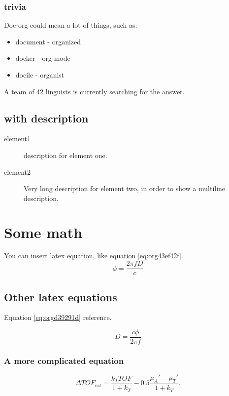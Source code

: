 \subsubsection{trivia}
\label{sec:org523db31}
Doc-org could mean a lot of things, such as:
\begin{itemize}
\item document - organized
\item docker - org mode
\item docile - organist
\end{itemize}
A team of 42 linguists is currently searching for the answer.
\subsection{with description}
\label{sec:orgaca7c79}
\begin{description}
\item[{element1}] description for element one.
\item[{element2}] Very long description for element two, in order to show a
multiline description.
\end{description}

\section{Some math}
\label{sec:orgd6668f9}
You can insert latex equation, like equation \ref{eq:org43ef42f}.
\begin{equation}
\label{eq:org43ef42f}
\phi = \frac{2\pi fD}{c}
\end{equation}
\subsection{Other latex equations}
\label{sec:org02e45ac}
Equation \ref{eq:orgd39291d} reference.

\begin{equation}
\label{eq:orgd39291d}
D = \frac{c\phi}{2\pi f}
\end{equation}

\subsubsection{A more complicated equation}
\label{sec:orga2feb55}

\begin{equation}
\Delta TOF_{est} = \frac{k_T TOF}{1+k_T } - 0.5 \frac{\mu_A' - \mu_T'}{1+k_T}.
\end{equation}

